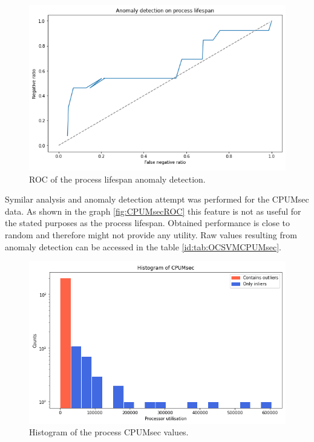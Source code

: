 \documentclass[a4paper,twoside,12pt]{book}
\begin{document}
\begin{figure}
	\centering
	\includegraphics[scale=0.9]{images/ROClifespan}
	\caption{ROC of the process lifespan anomaly detection.}
	\label{fig:lifespanROC}
 \end{figure}

 Symilar analysis and anomaly detection attempt was performed for the CPUMsec data. As shown in the graph \ref{fig:CPUMsecROC} this 
 feature is not as useful for the stated purposes as the process lifespan. Obtained performance is close to random and therefore might
 not provide any utility. Raw values resulting from anomaly detection can be accessed in the table \ref{id:tab:OCSVMCPUMsec}.

 \begin{figure}
	\centering
	\includegraphics[scale=0.9]{images/CPUMsecHist}
	\caption{Histogram of the process CPUMsec values.}
	\label{fig:cpumsecHist}
 \end{figure}
 
\end{document}
